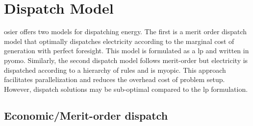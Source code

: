 \section{Dispatch Model}
\ac{osier} offers two models for dispatching energy. The first is a merit order
dispatch model that optimally dispatches electricity according to the marginal
cost of generation with perfect foresight. This model is formulated as a
\acf{lp} and written in \ac{pyomo}. Similarly, the second dispatch model follows
merit-order but electricity is dispatched according to a hierarchy of rules and
is myopic. This approach facilitates parallelization and reduces the overhead
cost of problem setup. However, dispatch solutions may be sub-optimal compared 
to the \ac{lp} formulation.

\subsection{Economic/Merit-order dispatch}
\label{section:merit_order}

